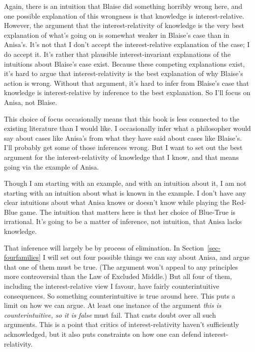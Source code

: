 \documentclass[
  10pt,
  letterpaper,
  twoside]{scrbook}
\begin{document}
Again, there is an intuition that Blaise did something horribly wrong
here, and one possible explanation of this wrongness is that knowledge
is interest-relative. However, the argument that the interest-relativity
of knowledge is the very best explanation of what's going on is somewhat
weaker in Blaise's case than in Anisa's. It's not that I don't accept
the interest-relative explanation of the case; I do accept it. It's
rather that plausible interest-invariant explanations of the intuitions
about Blaise's case exist. Because these competing explanations exist,
it's hard to argue that interest-relativity is the best explanation of
why Blaise's action is wrong. Without that argument, it's hard to infer
from Blaise's case that knowledge is interest-relative by inference to
the best explanation. So I'll focus on Anisa, not Blaise.

This choice of focus occasionally means that this book is less connected
to the existing literature than I would like. I occasionally infer what
a philosopher would say about cases like Anisa's from what they have
said about cases like Blaise's. I'll probably get some of those
inferences wrong. But I want to set out the best argument for the
interest-relativity of knowledge that I know, and that means going via
the example of Anisa.

Though I am starting with an example, and with an intuition about it, I
am not starting with an intuition about what is known in the example. I
don't have any clear intuitions about what Anisa knows or doesn't know
while playing the Red-Blue game. The intuition that matters here is that
her choice of Blue-True is irrational. It's going to be a matter of
inference, not intuition, that Anisa lacks knowledge.

That inference will largely be by process of elimination. In
Section~\ref{sec-fourfamilies} I will set out four possible things we
can say about Anisa, and argue that one of them must be true. (The
argument won't appeal to any principles more controversial than the Law
of Excluded Middle.) But all four of them, including the
interest-relative view I favour, have fairly counterintuitive
consequences. So something counterintuitive is true around here. This
puts a limit on how we can argue. At least one instance of the argument
\emph{this is counterintuitive, so it is false} must fail. That casts
doubt over all such arguments. This is a point that critics of
interest-relativity haven't sufficiently acknowledged, but it also puts
constraints on how one can defend interest-relativity.
\end{document}

